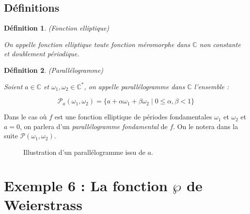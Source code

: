 \documentclass[12pt]{article}
\newtheorem{definition}{Définition}
\begin{document}
    \subsection{Définitions }
    \begin{definition}(Fonction elliptique)

    On appelle \textit{fonction elliptique} toute fonction méromorphe dans $\mathbb{C}$ non constante et doublement périodique.
    \end{definition}
    \begin{definition}(Parallélogramme)

    Soient $a \in \mathbb{C}$ et $\omega_1, \omega_2 \in \mathbb{C}^{*}$, on appelle \textit{parallélogramme} dans $\mathbb{C}$ l’ensemble :

    \[
\mathcal{P}_{a}{(\omega_1, \omega_2)} = \{ a + \alpha \omega_1 + \beta \omega_2 \mid 0 \leq \alpha, \beta < 1 \}
\]
\end{definition}

    Dans le cas où $f$ est une fonction elliptique de périodes fondamentales $\omega_1$ et $\omega_2$ et $a = 0$, on parlera d’un \textit{parallélogramme fondamental} de $f$. On le notera dans la suite $\mathcal{P}{(\omega_1, \omega_2)}$.

    \begin{center}
        \begin{figure}[h]
            \centering
            \caption{Illustration d’un parallélogramme issu de $a$.}
        \end{figure}
\end{center}

\newpage

 	\section*{\textbf{Exemple 6 :} La fonction \(\wp\) de Weierstrass}
\end{document}
